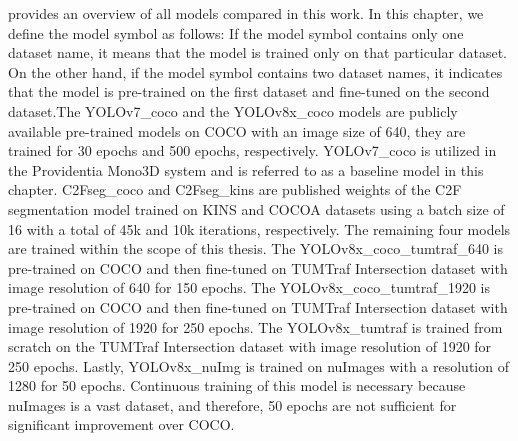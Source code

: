  provides an overview of all models compared in this work. In this chapter, we define the model symbol as follows: If the model symbol contains only one dataset name, it means that the model is trained only on that particular dataset. On the other hand, if the model symbol contains two dataset names, it indicates that the model is pre-trained on the first dataset and fine-tuned on the second dataset.The YOLOv7\_coco and the YOLOv8x\_coco models are publicly available pre-trained models on COCO with an image size of 640, they are trained for 30 epochs and 500 epochs, respectively. YOLOv7\_coco is utilized in the Providentia Mono3D system and is referred to as a baseline model in this chapter. C2Fseg\_coco and C2Fseg\_kins are published weights of the C2F segmentation model trained on KINS and COCOA datasets using a batch size of 16 with a total of 45k and 10k iterations, respectively. The remaining four models are trained within the scope of this thesis. The YOLOv8x\_coco\_tumtraf\_640 is pre-trained on COCO and then fine-tuned on TUMTraf Intersection dataset with image resolution of 640 for 150 epochs. The YOLOv8x\_coco\_tumtraf\_1920 is pre-trained on COCO and then fine-tuned on TUMTraf Intersection dataset with image resolution of 1920 for 250 epochs. The YOLOv8x\_tumtraf is trained from scratch on the TUMTraf Intersection dataset  with image resolution of 1920 for 250 epochs. Lastly, YOLOv8x\_nuImg is trained on nuImages with a resolution of 1280 for 50 epochs. Continuous training of this model is necessary because nuImages is a vast dataset, and therefore, 50 epochs are not sufficient for significant improvement over COCO.

